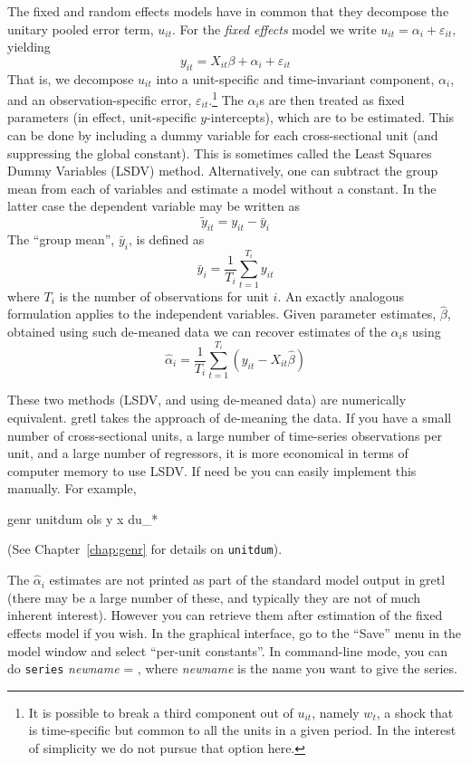 The fixed and random effects models have in common that they decompose
the unitary pooled error term, $u_{it}$.  For the \textsl{fixed effects}
model we write $u_{it} = \alpha_i + \varepsilon_{it}$, yielding
\begin{equation}
\label{eq:FE}
y_{it} = X_{it}\beta + \alpha_i + \varepsilon_{it}
\end{equation}
That is, we decompose $u_{it}$ into a unit-specific and time-invariant
component, $\alpha_i$, and an observation-specific error,
$\varepsilon_{it}$.\footnote{It is possible to break a third component
  out of $u_{it}$, namely $w_t$, a shock that is time-specific but
  common to all the units in a given period.  In the interest of
  simplicity we do not pursue that option here.}  The $\alpha_i$s are
then treated as fixed parameters (in effect, unit-specific
$y$-intercepts), which are to be estimated.  This can be done by
including a dummy variable for each cross-sectional unit (and
suppressing the global constant).  This is sometimes called the Least
Squares Dummy Variables (LSDV) method.  Alternatively, one can subtract
the group mean from each of variables and estimate a model without a
constant.  In the latter case the dependent variable may be written as
\[
\tilde{y}_{it} = y_{it} - \bar{y}_i
\]
The ``group mean'', $\bar{y}_i$, is defined as
\[
\bar{y}_i = \frac{1}{T_i} \sum_{t=1}^{T_i} y_{it}
\]
where $T_i$ is the number of observations for unit $i$.  An exactly
analogous formulation applies to the independent variables.  Given
parameter estimates, $\hat{\beta}$, obtained using such de-meaned data
we can recover estimates of the $\alpha_i$s using
\[
\hat{\alpha}_i = \frac{1}{T_i} \sum_{t=1}^{T_i} 
   \left(y_{it} - X_{it}\hat{\beta}\right)
\]

These two methods (LSDV, and using de-meaned data) are numerically
equivalent. gretl takes the approach of de-meaning the data.  If
you have a small number of cross-sectional units, a large number of
time-series observations per unit, and a large number of regressors,
it is more economical in terms of computer memory to use LSDV.  If 
need be you can easily implement this manually.  For example,
%
\begin{code}
genr unitdum
ols y x du_*
\end{code}
%
(See Chapter~\ref{chap:genr} for details on \texttt{unitdum}).

The $\hat{\alpha}_i$ estimates are not printed as part of the standard
model output in gretl (there may be a large number of these, and
typically they are not of much inherent interest).  However you can
retrieve them after estimation of the fixed effects model if you wish.
In the graphical interface, go to the ``Save'' menu in the model
window and select ``per-unit constants''.  In command-line mode, you
can do \texttt{series} \textsl{newname} = , where
\textsl{newname} is the name you want to give the series.

